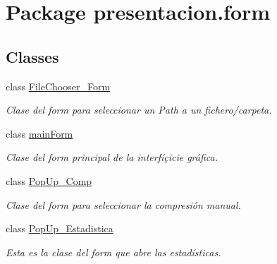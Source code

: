 \hypertarget{namespacepresentacion_1_1form}{}\section{Package presentacion.\+form}
\label{namespacepresentacion_1_1form}
\subsection*{Classes}
\begin{DoxyCompactItemize}
\item 
class \hyperlink{classpresentacion_1_1form_1_1FileChooser__Form}{File\+Chooser\+\_\+\+Form}
\begin{DoxyCompactList}\small\item\em Clase del form para seleccionar un Path a un fichero/carpeta. \end{DoxyCompactList}\item 
class \hyperlink{classpresentacion_1_1form_1_1mainForm}{main\+Form}
\begin{DoxyCompactList}\small\item\em Clase del form principal de la interfíçicie gráfica. \end{DoxyCompactList}\item 
class \hyperlink{classpresentacion_1_1form_1_1PopUp__Comp}{Pop\+Up\+\_\+\+Comp}
\begin{DoxyCompactList}\small\item\em Clase del form para seleccionar la compresión manual. \end{DoxyCompactList}\item 
class \hyperlink{classpresentacion_1_1form_1_1PopUp__Estadistica}{Pop\+Up\+\_\+\+Estadistica}
\begin{DoxyCompactList}\small\item\em Esta es la clase del form que abre las estadísticas. \end{DoxyCompactList}\end{DoxyCompactItemize}
